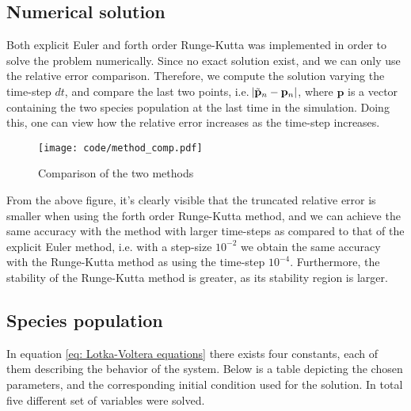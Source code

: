 \documentclass[a4paper]{article}
\begin{document}
\subsection{Numerical solution}
Both explicit Euler and forth order Runge-Kutta was implemented in order to solve the problem numerically.
Since no exact solution exist, and we can only use the relative error comparison. Therefore, we compute the solution varying the time-step $dt$, and compare the last two points, i.e. $\abs{\tilde{\mathbf{p}}_{n}- \mathbf{p}_n}$, where $\mathbf{p}$ is a vector containing the two species population at the last time in the simulation. Doing this, one can view how the relative error increases as the time-step increases.
\begin{minipage}{0.45\textwidth}
\begin{figure}[H]
    \centering
    \texttt{[image: code/method\_comp.pdf]}
    \caption{Comparison of the two methods}
    \label{fig: method comparison}
\end{figure}
\end{minipage}
\begin{minipage}{0.45\textwidth}
From the above figure, it's clearly visible that the truncated relative error is smaller when using the forth order Runge-Kutta method, and we can achieve the same accuracy with the method with larger time-steps as compared to that of the explicit Euler method, i.e. with a step-size $10^{-2}$ we obtain the same accuracy with the Runge-Kutta method as using the time-step $10^{-4}$. Furthermore, the stability of the Runge-Kutta method is greater, as its stability region is larger.
\end{minipage}

\subsection{Species population}
In equation \eqref{eq: Lotka-Voltera equations} there exists four constants, each of them describing the behavior of the system. Below is a table depicting the chosen parameters, and the corresponding initial condition used for the solution. In total five different set of variables were solved.
\end{document}
